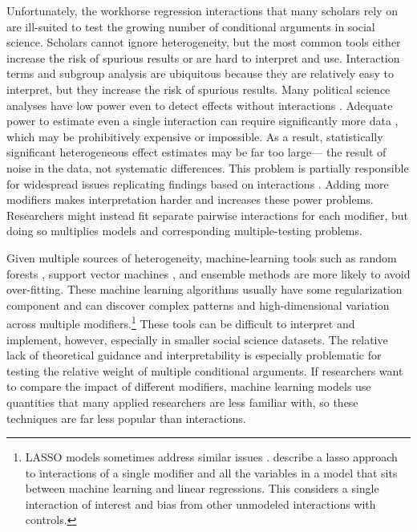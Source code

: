 \documentclass[12pt]{article}
\begin{document}
Unfortunately, the workhorse regression interactions that many scholars rely on are ill-suited to test the growing number of conditional arguments in social science. 
Scholars cannot ignore heterogeneity, but the most common tools either increase the risk of spurious results or are hard to interpret and use. 
Interaction terms and subgroup analysis are ubiquitous because they are relatively easy to interpret, but they increase the risk of spurious results. 
Many political science analyses have low power even to detect effects without interactions \citep{ArelBundocketal2026}.
Adequate power to estimate even a single interaction can require significantly more data \citep{Gelman2018}, which may be prohibitively expensive or impossible.
As a result, statistically significant heterogeneous effect estimates may be far too large--- the result of noise in the data, not systematic differences. 
This problem is partially responsible for widespread issues replicating findings based on interactions \citep{Simmonsetal2011}. 
Adding more modifiers makes interpretation harder and increases these power problems.
Researchers might instead fit separate pairwise interactions for each modifier, but doing so multiplies models and corresponding multiple-testing problems.


Given multiple sources of heterogeneity, machine-learning tools such as random forests \citep{GreenKern2012, WagerAthey2018}, support vector machines \citep{ImaiRatkovic2013}, and ensemble methods \citep{Grimmeretal2017, Kuenzeletal2019, Dorieetal2022} are more likely to avoid over-fitting.
These machine learning algorithms usually have some regularization component and can discover complex patterns and high-dimensional variation across multiple modifiers.\footnote{LASSO models sometimes address similar issues \citep{RatkovicTingley2017}. \citet{BlackwellOlson2022} describe a lasso approach to interactions of a single modifier and all the variables in a model that sits between machine learning and linear regressions. This considers a single interaction of interest and bias from other unmodeled interactions with controls.}
These tools can be difficult to interpret and implement, however, especially in smaller social science datasets. 
The relative lack of theoretical guidance and interpretability is especially problematic for testing the relative weight of multiple conditional arguments.
If researchers want to compare the impact of different modifiers, machine learning models use quantities that many applied researchers are less familiar with, so these techniques are far less popular than interactions.
\end{document}
